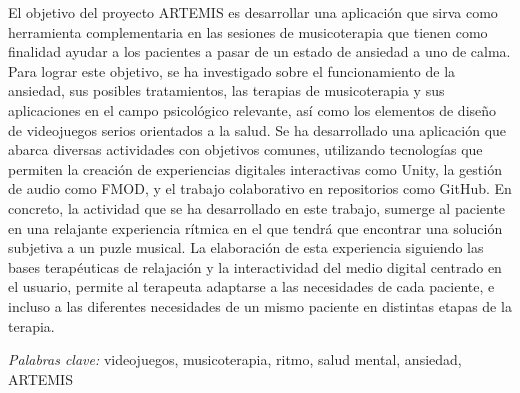 El objetivo del proyecto ARTEMIS es desarrollar una aplicación que sirva como herramienta complementaria en las sesiones de musicoterapia que tienen como finalidad ayudar a los pacientes a pasar de un estado de ansiedad a uno de calma. Para lograr este objetivo, se ha investigado sobre el funcionamiento de la ansiedad, sus posibles tratamientos, las terapias de musicoterapia y sus aplicaciones en el campo psicológico relevante, así como los elementos de diseño de videojuegos serios orientados a la salud. Se ha desarrollado una aplicación que abarca diversas actividades con objetivos comunes, utilizando tecnologías que permiten la creación de experiencias digitales interactivas como Unity, la gestión de audio como FMOD, y el trabajo colaborativo en repositorios como GitHub. En concreto, la actividad que se ha desarrollado en este trabajo, sumerge al paciente en una relajante experiencia rítmica en el que tendrá que encontrar una solución subjetiva a un puzle musical. La elaboración de esta experiencia siguiendo las bases terapéuticas de relajación y la interactividad del medio digital centrado en el usuario, permite al terapeuta adaptarse a las necesidades de cada paciente, e incluso a las diferentes necesidades de un mismo paciente en distintas etapas de la terapia.

\textit{Palabras clave:} videojuegos, musicoterapia, ritmo, salud mental, ansiedad, ARTEMIS